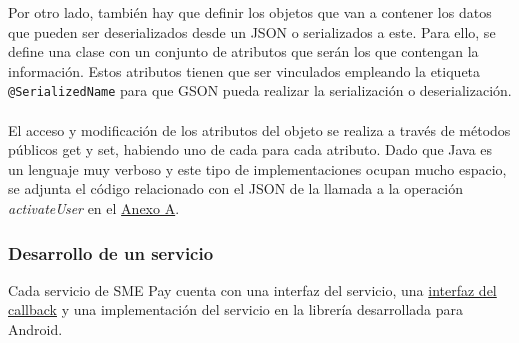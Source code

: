 \documentclass[a4paper, 12pt]{article}
\begin{document}
\bigbreak
Por otro lado, también hay que definir los objetos que van a contener los datos que pueden ser deserializados desde un JSON o serializados a este. Para ello, se define una clase con un conjunto de atributos
que serán los que contengan la información. Estos atributos tienen que ser vinculados empleando la etiqueta \verb~@SerializedName~ para que GSON pueda realizar la serialización
o deserialización.
\\
\\
El acceso y modificación de los atributos del objeto se realiza a través de métodos públicos get y set, habiendo uno de cada para cada atributo. Dado que Java es un lenguaje muy verboso y este tipo de implementaciones
ocupan mucho espacio, se adjunta el código relacionado con el JSON de la llamada a la operación \emph{activateUser} en el \hyperref[code:android-json]{Anexo A}.
\subsubsection{Desarrollo de un servicio}
\label{sec-4-1-3}
Cada servicio de SME Pay cuenta con una interfaz del servicio, una \hyperref[code:androidcallback]{interfaz del callback} y una implementación del servicio en la librería desarrollada para Android.
\end{document}

